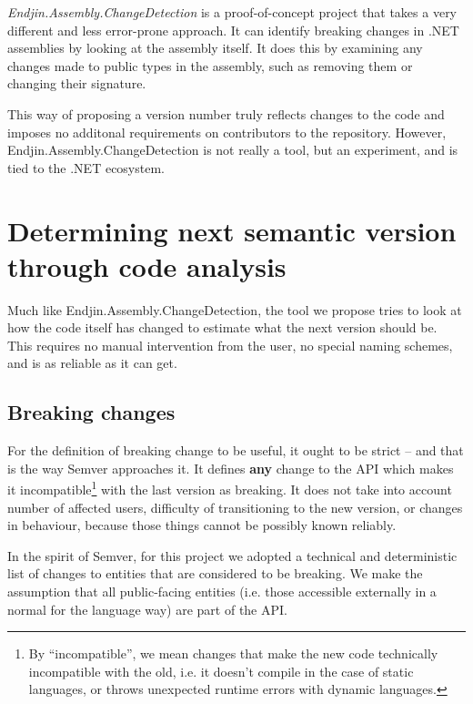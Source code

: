 \documentclass{l4proj}
\begin{document}
\textit{Endjin.Assembly.ChangeDetection}\cite{Endjin} is a
proof-of-concept project that takes a very different and less
error-prone approach. It can identify breaking changes in .NET
assemblies by looking at the assembly itself. It does this
by examining any changes made to public types in the assembly, such as
removing them or changing their signature.

This way of proposing a version number truly reflects changes to
the code and imposes no additonal requirements on contributors to
the repository. However, Endjin.Assembly.ChangeDetection is not really
a tool, but an experiment, and is tied to the .NET ecosystem.

\chapter{Determining next semantic version through code analysis}

Much like Endjin.Assembly.ChangeDetection, the tool we propose tries
to look at how the code itself has changed to estimate what the next
version should be. This requires no manual intervention from the user,
no special naming schemes, and is as reliable as it can get.


\section{Breaking changes}

For the definition of breaking change to be useful, it ought to be
strict -- and that is the way Semver approaches it. It defines
\textbf{any} change to the API which makes it incompatible\footnote{By
``incompatible'', we mean changes that make the new code technically
incompatible with the old, i.e. it doesn't compile in the case of
static languages, or throws unexpected runtime errors with dynamic
languages.} with the last version as breaking. It does not take into
account number of affected users, difficulty of transitioning to the
new version, or changes in behaviour, because those things cannot be
possibly known reliably.

In the spirit of Semver, for this project we adopted a technical and
deterministic list of changes to entities that are considered
to be breaking. We make the assumption that all public-facing entities
(i.e. those accessible externally in a normal for the language way)
are part of the API.
\end{document}
